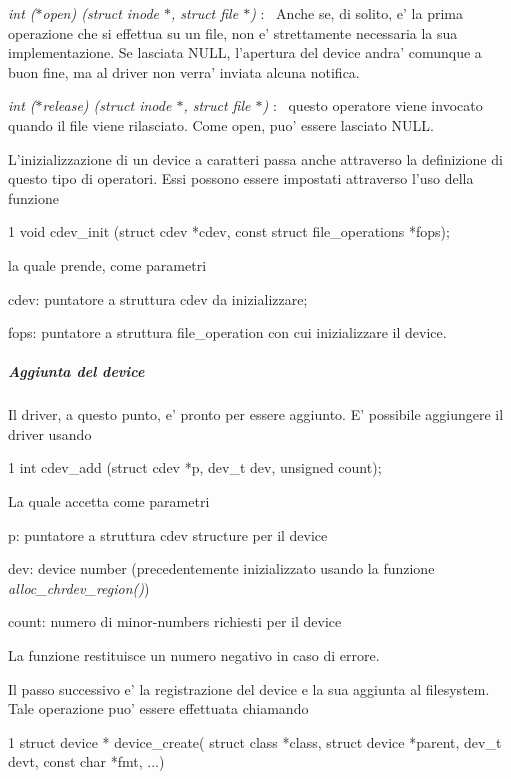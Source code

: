 \begin{DoxyItemize}
\item {\itshape int ($\ast$open) (struct inode $\ast$, struct file $\ast$)} \+:~\newline
 Anche se, di solito, e' la prima operazione che si effettua su un file, non e' strettamente necessaria la sua implementazione. Se lasciata N\+U\+L\+L, l'apertura del device andra' comunque a buon fine, ma al driver non verra' inviata alcuna notifica.
\item {\itshape int ($\ast$release) (struct inode $\ast$, struct file $\ast$)} \+:~\newline
 questo operatore viene invocato quando il file viene rilasciato. Come open, puo' essere lasciato N\+U\+L\+L.
\end{DoxyItemize}

L'inizializzazione di un device a caratteri passa anche attraverso la definizione di questo tipo di operatori. Essi possono essere impostati attraverso l'uso della funzione 
\begin{DoxyCode}
1 void cdev\_init (struct cdev *cdev, const struct file\_operations *fops);
\end{DoxyCode}
 la quale prende, come parametri
\begin{DoxyItemize}
\item cdev\+: puntatore a struttura cdev da inizializzare;
\item fops\+: puntatore a struttura file\+\_\+operation con cui inizializzare il device.
\end{DoxyItemize}

\subparagraph*{Aggiunta del device}

Il driver, a questo punto, e' pronto per essere aggiunto. E' possibile aggiungere il driver usando 
\begin{DoxyCode}
1 int cdev\_add (struct cdev *p, dev\_t dev, unsigned count);
\end{DoxyCode}
 La quale accetta come parametri
\begin{DoxyItemize}
\item p\+: puntatore a struttura cdev structure per il device
\item dev\+: device number (precedentemente inizializzato usando la funzione {\itshape alloc\+\_\+chrdev\+\_\+region()})
\item count\+: numero di minor-\/numbers richiesti per il device
\end{DoxyItemize}

La funzione restituisce un numero negativo in caso di errore.

Il passo successivo e' la registrazione del device e la sua aggiunta al filesystem. Tale operazione puo' essere effettuata chiamando 
\begin{DoxyCode}
1 struct device * device\_create( struct class *class, struct device *parent, dev\_t devt, const char *fmt,
       ...)
\end{DoxyCode}

